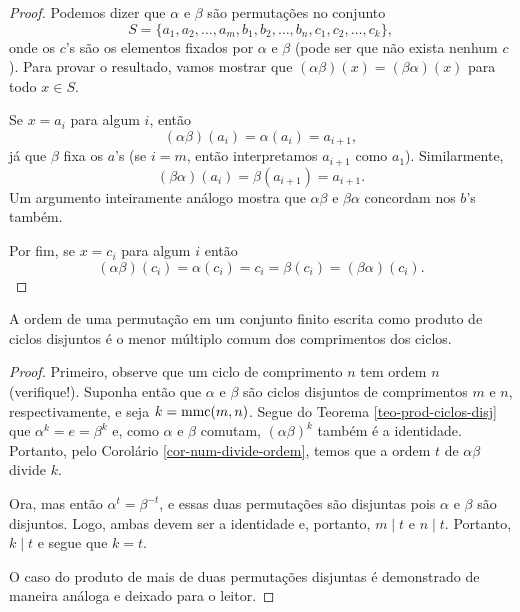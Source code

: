    \begin{proof}
        Podemos dizer que $\alpha$ e $\beta$ são permutações no conjunto
        \[
        S = \{ a_1, a_2, \dots, a_m, b_1, b_2, \dots, b_n, c_1, c_2, \dots, c_k \},
        \]
        onde os $c$'s são os elementos fixados por $\alpha$ e $\beta$ (pode ser que não exista nenhum $c$).
        Para provar o resultado, vamos mostrar que $(\alpha\beta)(x) = (\beta\alpha)(x)$ para todo $x\in S$.
        
        Se $x = a_i$ para algum $i$, então
        \[
        (\alpha\beta)(a_i) = \alpha(a_i) = a_{i+1},
        \]
        já que $\beta$ fixa os $a$'s (se $i=m$, então interpretamos $a_{i+1}$ como $a_1$). Similarmente,
        \[
        (\beta\alpha)(a_i) = \beta(a_{i+1}) = a_{i+1}.
        \]
        Um argumento inteiramente análogo mostra que $\alpha\beta$ e $\beta\alpha$ concordam nos $b$'s também.
        
        Por fim, se $x = c_i$ para algum $i$ então
        \[
        (\alpha\beta)(c_i) = \alpha(c_i) = c_i = \beta(c_i) = (\beta\alpha)(c_i).
        \]
    \end{proof}
    \begin{theorem}
    \label{teo-ordem-perm}
        A ordem de uma permutação em um conjunto finito escrita como produto de ciclos disjuntos
        é o menor múltiplo comum dos comprimentos dos ciclos.
    \end{theorem}
    \begin{proof}
        Primeiro, observe que um ciclo de comprimento $n$ tem ordem $n$ (verifique!). Suponha então
        que $\alpha$ e $\beta$ são ciclos disjuntos de comprimentos $m$ e $n$, respectivamente, e seja
        $k = \operatorname{mmc}(m,n)$. Segue do Teorema \ref{teo-prod-ciclos-disj} que $\alpha^k = e = \beta^k$ e,
        como $\alpha$ e $\beta$ comutam, $(\alpha\beta)^k$ também é a identidade. Portanto, pelo
        Corolário \ref{cor-num-divide-ordem}, temos que a ordem $t$ de $\alpha\beta$ divide $k$.
        
        Ora, mas então $\alpha^t = \beta^{-t}$, e essas duas permutações são disjuntas
        pois $\alpha$ e $\beta$ são disjuntos. Logo, ambas devem ser a identidade e, portanto,
        $m\mid t$ e $n\mid t$. Portanto, $k\mid t$ e segue que $k=t$.
        
        O caso do produto de mais de duas permutações disjuntas é demonstrado de maneira análoga
        e deixado para o leitor.
    \end{proof}
